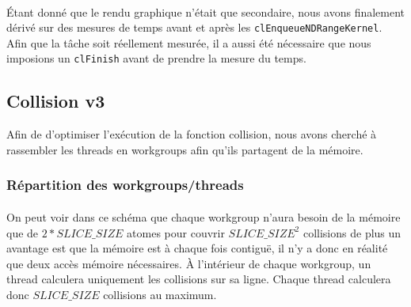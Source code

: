 \documentclass{article}
\begin{document}
\paragraph{}
Étant donné que le rendu graphique n'était que secondaire, nous avons finalement
dérivé sur des mesures de temps avant et après les
\verb!clEnqueueNDRangeKernel!. Afin que la tâche soit réellement mesurée, il
a aussi été nécessaire que nous imposions un \verb!clFinish! avant de prendre
la mesure du temps.

\subsection{Collision v3}
Afin de d'optimiser l'exécution de la fonction collision, nous avons cherché à
rassembler les threads en workgroups afin qu'ils partagent de la mémoire.

\subsubsection{Répartition des workgroups/threads}
\paragraph{}
On peut voir dans ce schéma que chaque workgroup n'aura besoin de la mémoire
que de $2 * SLICE\_SIZE$ atomes pour couvrir $SLICE\_SIZE^2$ collisions de plus
un avantage est que la mémoire est à chaque fois contiguë, il n'y a donc en
réalité que deux accès mémoire nécessaires. À l'intérieur de chaque workgroup,
un thread calculera uniquement les collisions sur sa ligne. Chaque thread
calculera donc $SLICE\_SIZE$ collisions au maximum.
\end{document}
